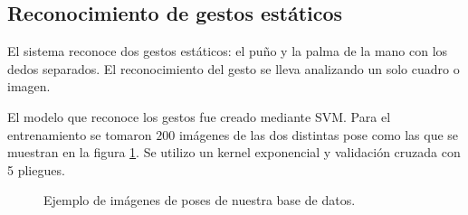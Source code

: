 \subsection{Reconocimiento de gestos estáticos}\label{RecognitionEstatic}

El sistema reconoce dos gestos estáticos: el puño y la palma de la mano con los dedos separados. El reconocimiento del gesto se lleva analizando un solo cuadro o imagen.  

El modelo que reconoce los gestos fue creado mediante SVM. Para el entrenamiento se tomaron $200$ imágenes de las dos distintas pose como las que se muestran en la figura \ref{fig:SVMTrainingStatic}. Se utilizo un kernel exponencial y validación cruzada con 5 pliegues.   

\begin{figure}[h!]
\begin{center}
      \quad
{}
\end{center}
\caption{Ejemplo de imágenes de poses de nuestra base de datos.}
\label{fig:SVMTrainingStatic}
\end{figure}


